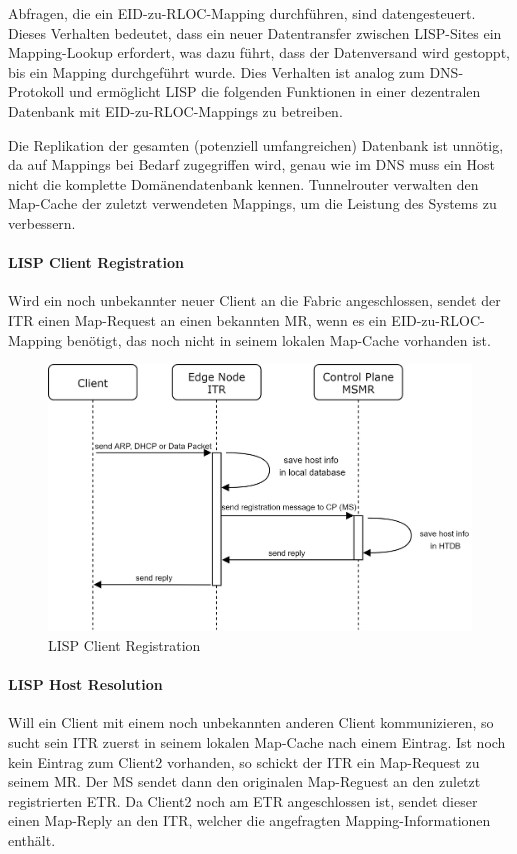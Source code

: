 Abfragen, die ein EID-zu-RLOC-Mapping durchführen, sind datengesteuert. Dieses Verhalten bedeutet, dass ein neuer Datentransfer zwischen LISP-Sites ein Mapping-Lookup erfordert, was dazu führt, dass der Datenversand wird gestoppt, bis ein Mapping durchgeführt wurde. Dies Verhalten ist analog zum DNS-Protokoll und ermöglicht LISP die folgenden Funktionen in einer dezentralen Datenbank mit EID-zu-RLOC-Mappings zu betreiben. 

Die Replikation der gesamten (potenziell umfangreichen) Datenbank ist unnötig, da auf Mappings bei Bedarf zugegriffen wird, genau wie im DNS muss ein Host nicht die komplette Domänendatenbank kennen. Tunnelrouter verwalten den Map-Cache der zuletzt verwendeten Mappings, um die Leistung des Systems zu verbessern.

\paragraph{LISP Client Registration}
Wird ein noch unbekannter neuer Client an die Fabric angeschlossen, sendet der ITR einen Map-Request an einen bekannten MR, wenn es ein EID-zu-RLOC-Mapping benötigt, das noch nicht in seinem lokalen Map-Cache vorhanden ist.

\begin{figure}[H]
	\centering
	\includegraphics[width=0.8\linewidth]{img/Absicherung/LISP-ClientRegistration}
	\caption{LISP Client Registration}
	\label{fig:LISP Client Registration}
\end{figure}

\paragraph{LISP Host Resolution}
Will ein Client mit einem noch unbekannten anderen Client kommunizieren, so sucht sein ITR zuerst in seinem lokalen Map-Cache nach einem Eintrag. Ist noch kein Eintrag zum Client2 vorhanden, so schickt der ITR ein Map-Request zu seinem MR. Der MS sendet dann den originalen Map-Reguest an den zuletzt registrierten ETR. Da Client2 noch am ETR angeschlossen ist, sendet dieser einen Map-Reply an den ITR, welcher die angefragten Mapping-Informationen enthält.

